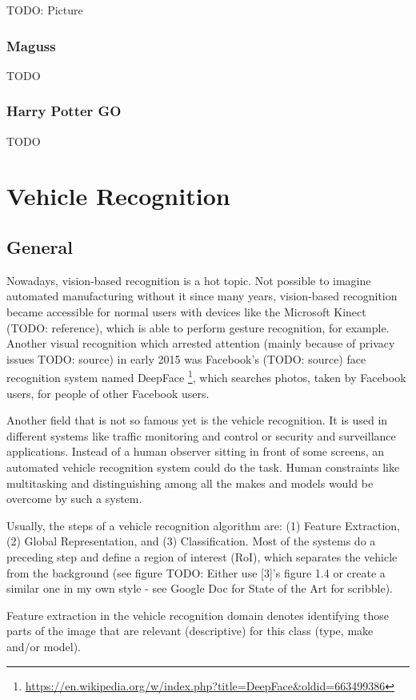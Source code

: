 TODO: Picture

\subsubsection{Maguss}
TODO

\subsubsection{Harry Potter GO}
TODO


\section{Vehicle Recognition}

\subsection{General}
Nowadays, vision-based recognition is a hot topic. Not possible to imagine automated manufacturing without it since many years, vision-based recognition became accessible for normal users with devices like the Microsoft Kinect (TODO: reference), which is able to perform gesture recognition, for example. Another visual recognition which arrested attention (mainly because of privacy issues TODO: source) in early 2015 was Facebook’s (TODO: source) face recognition system named DeepFace \footnote{\url{https://en.wikipedia.org/w/index.php?title=DeepFace&oldid=663499386}}, which searches photos, taken by Facebook users, for people of other Facebook users.

Another field that is not so famous yet is the vehicle recognition. It is used in different systems like traffic monitoring and control or security and surveillance applications. Instead of a human observer sitting in front of some screens, an automated vehicle recognition system could do the task. Human constraints like multitasking and distinguishing among all the makes and models would be overcome by such a system.

Usually, the steps of a vehicle recognition algorithm are: (1) Feature Extraction, (2) Global Representation, and (3) Classification. Most of the systems do a preceding step and define a region of interest (RoI), which separates the vehicle from the background (see figure TODO: Either use [3]’s figure 1.4 or create a similar one in my own style - see Google Doc for State of the Art for scribble).

Feature extraction in the vehicle recognition domain denotes identifying those parts of the image that are relevant (descriptive) for this class (type, make and/or model).

